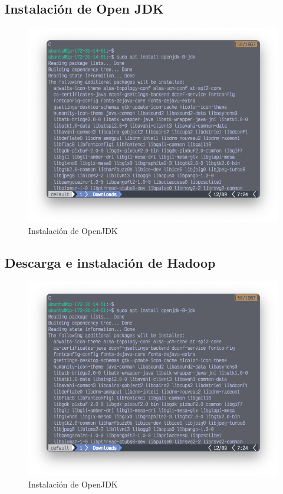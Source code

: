 \clearpage

\subsection{Instalación de Open JDK}
\begin{figure}[h]
	\centering
	\includegraphics[scale=.35] {img/15-installJdk}
	\caption{Instalación de OpenJDK}
	\label{fig:15}	
\end{figure}

\subsection{Descarga e instalación de Hadoop}
\begin{figure}[h]
	\centering
	\includegraphics[scale=.35] {img/15-installJdk}
	\caption{Instalación de OpenJDK}
	\label{fig:15}	
\end{figure}

